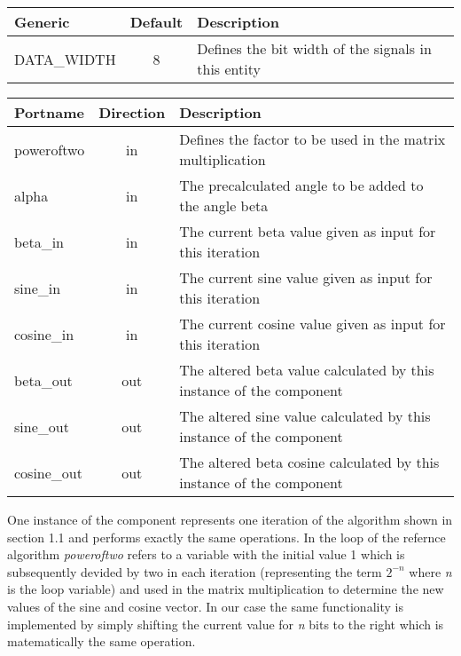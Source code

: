 \begin{center}
	\begin{tabular}{ | l | c | l | }
		\hline
		\textbf{Generic} & \textbf{Default} & \textbf{Description} \\
		\hline
		DATA\_WIDTH & 8 & Defines the bit width of the signals in this entity \\
		\hline
	\end{tabular} 
\end{center}

\begin{center}
	\begin{tabular}{ | l | c | l | }
		\hline
		\textbf{Portname} & \textbf{Direction} & \textbf{Description} \\
		\hline
		poweroftwo & in & Defines the factor to be used in the matrix multiplication \\
		alpha & in  & The precalculated angle to be added to the angle beta \\
		beta\_in & in  & The current beta value given as input for this iteration \\
		sine\_in & in  & The current sine value given as input for this iteration \\
		cosine\_in & in  & The current cosine value given as input for this iteration \\
		beta\_out & out  & The altered beta value calculated by this instance of the component \\
		sine\_out & out  & The altered sine value calculated by this instance of the component \\
		cosine\_out & out  & The altered beta cosine calculated by this instance of the component \\
		\hline
	\end{tabular} 
\end{center}

One instance of the component represents one iteration of the algorithm shown in section 1.1 and performs exactly the same operations. In the loop of the refernce algorithm \textit{poweroftwo} refers to a variable with the initial value 1 which is subsequently devided by two in each iteration (representing the term \(2^{-n}\) where \textit{n} is the loop variable) and used in the matrix multiplication to determine the new values of the sine and cosine vector. In our case the same functionality is implemented by simply shifting the current value for \textit{n} bits to the right which is matematically the same operation.

